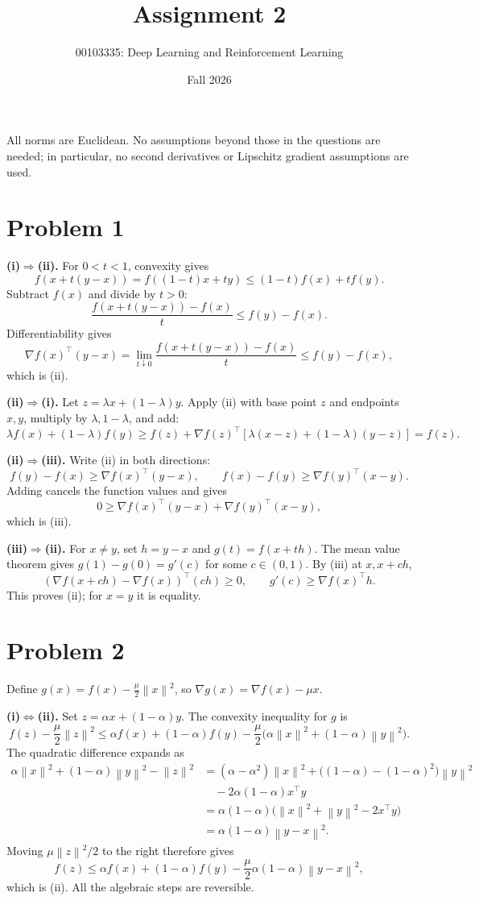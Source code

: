 \documentclass[11pt]{article}
\title{Assignment 2}
\author{00103335: Deep Learning and Reinforcement Learning}
\date{Fall 2026}
\newcommand{\norm}[1]{\left\lVert#1\right\rVert}
\begin{document}
\maketitle
All norms are Euclidean. No assumptions beyond those in the questions
are needed; in particular, no second derivatives or Lipschitz gradient
assumptions are used.

\section*{Problem 1}
\textbf{(i)$\Rightarrow$(ii).}
For $0<t<1$, convexity gives
\[
 f(x+t(y-x))=f((1-t)x+ty)\leq(1-t)f(x)+tf(y).
\]
Subtract $f(x)$ and divide by $t>0$:
\[
 \frac{f(x+t(y-x))-f(x)}t\leq f(y)-f(x).
\]
Differentiability gives
\[
 \nabla f(x)^\top(y-x)
 =\lim_{t\downarrow0}\frac{f(x+t(y-x))-f(x)}t
 \leq f(y)-f(x),
\]
which is (ii).

\textbf{(ii)$\Rightarrow$(i).}
Let $z=\lambda x+(1-\lambda)y$. Apply (ii) with base point $z$
and endpoints $x,y$, multiply by $\lambda,1-\lambda$, and add:
\[
 \lambda f(x)+(1-\lambda)f(y)
 \geq f(z)+\nabla f(z)^\top
 [\lambda(x-z)+(1-\lambda)(y-z)]=f(z).
\]

\textbf{(ii)$\Rightarrow$(iii).}
Write (ii) in both directions:
\[
 f(y)-f(x)\geq\nabla f(x)^\top(y-x),\qquad
 f(x)-f(y)\geq\nabla f(y)^\top(x-y).
\]
Adding cancels the function values and gives
\[
 0\geq\nabla f(x)^\top(y-x)+\nabla f(y)^\top(x-y),
\]
which is (iii).

\textbf{(iii)$\Rightarrow$(ii).}
For $x\ne y$, set $h=y-x$ and $g(t)=f(x+th)$.
The mean value theorem gives $g(1)-g(0)=g'(c)$ for some $c\in(0,1)$.
By (iii) at $x,x+ch$,
\[
 (\nabla f(x+ch)-\nabla f(x))^\top(ch)\geq0,
 \qquad g'(c)\geq\nabla f(x)^\top h.
\]
This proves (ii); for $x=y$ it is equality.

\section*{Problem 2}
Define $g(x)=f(x)-\frac\mu2\norm x^2$, so
$\nabla g(x)=\nabla f(x)-\mu x$.

\textbf{(i)$\Leftrightarrow$(ii).}
Set $z=\alpha x+(1-\alpha)y$. The convexity inequality for $g$ is
\[
 f(z)-\frac\mu2\norm z^2
 \leq\alpha f(x)+(1-\alpha)f(y)
 -\frac\mu2\big(\alpha\norm x^2+(1-\alpha)\norm y^2\big).
\]
The quadratic difference expands as
\begin{align*}
 \alpha\norm x^2+(1-\alpha)\norm y^2-\norm z^2
 &=(\alpha-\alpha^2)\norm x^2
   +\big((1-\alpha)-(1-\alpha)^2\big)\norm y^2\\
 &\quad-2\alpha(1-\alpha)x^\top y\\
 &=\alpha(1-\alpha)\big(\norm x^2+\norm y^2-2x^\top y\big)\\
 &=\alpha(1-\alpha)\norm{y-x}^2.
\end{align*}
Moving $\mu\norm z^2/2$ to the right therefore gives
\[
 f(z)\leq\alpha f(x)+(1-\alpha)f(y)
 -\frac\mu2\alpha(1-\alpha)\norm{y-x}^2,
\]
which is (ii). All the algebraic steps are reversible.
\end{document}
